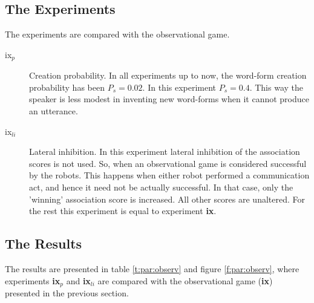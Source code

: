 \subsection{The Experiments}

The experiments are compared with the observational game.

\begin{description}
\item[ix$_p$] Creation probability. In all experiments up to now, the word-form creation probability has been $P_s=0.02$. In this experiment $P_s=0.4$. This way the speaker is less modest in inventing new word-forms when it cannot produce an utterance. 
\item[ix$_{li}$] Lateral inhibition. In this experiment lateral inhibition of the association scores is not used. So, when an observational game is considered successful by the robots. This happens when either robot performed a communication act, and hence it need not be actually successful. In that case, only the 'winning' association score is increased. All other scores are unaltered. For the rest this experiment is equal to experiment {\bf ix}. 
\end{description}

\subsection{The Results}

The results are presented in table \ref{t:par:observ} and figure \ref{f:par:observ}, where experiments {\bf ix$_p$} and {\bf ix$_{li}$} are compared with the observational game ({\bf ix}) presented in the previous section.

